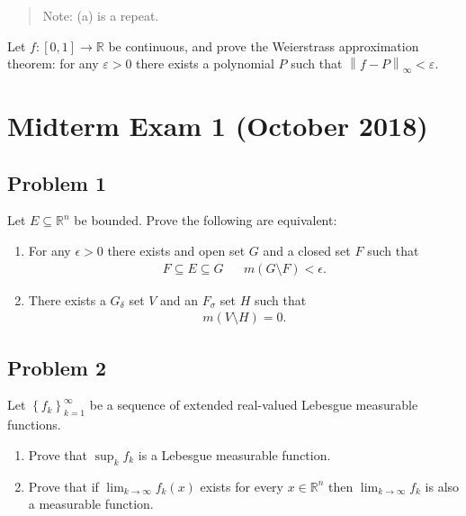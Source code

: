 \begin{quote}
Note: (a) is a repeat.
\end{quote}

Let \(f: [0, 1]\to {\mathbb{R}}\) be continuous, and prove the
Weierstrass approximation theorem: for any \({\varepsilon}> 0\) there
exists a polynomial \(P\) such that
\({\left\lVert {f - P} \right\rVert}_{\infty} < {\varepsilon}\).

\hypertarget{midterm-exam-1-october-2018}{%
\section{Midterm Exam 1 (October
2018)}\label{midterm-exam-1-october-2018}}

\hypertarget{problem-1}{%
\subsection{Problem 1}\label{problem-1}}

\label{equivalence_of_approximating_measures} Let
\(E \subseteq {\mathbb{R}}^n\) be bounded. Prove the following are
equivalent:

\begin{enumerate}
\def\labelenumi{\arabic{enumi}.}
\item
  For any \(\epsilon>0\) there exists and open set \(G\) and a closed
  set \(F\) such that
  \begin{align*}
  F \subseteq E \subseteq G && m(G\setminus F) < \epsilon
  .\end{align*}
\item
  There exists a \(G_ \delta\) set \(V\) and an \(F_ \sigma\) set \(H\)
  such that
  \begin{align*}
  m(V\setminus H) = 0
  .\end{align*}
\end{enumerate}

\hypertarget{problem-2}{%
\subsection{Problem 2}\label{problem-2}}

Let \(\left\{{ f_k }\right\} _{k=1}^{\infty }\) be a sequence of
extended real-valued Lebesgue measurable functions.

\begin{enumerate}
\def\labelenumi{\alph{enumi}.}
\item
  Prove that \(\sup_k f_k\) is a Lebesgue measurable function.
\item
  Prove that if \(\lim_{k \to \infty } f_k(x)\) exists for every
  \(x \in {\mathbb{R}}^n\) then \(\lim_{k\to \infty } f_k\) is also a
  measurable function.
\end{enumerate}

